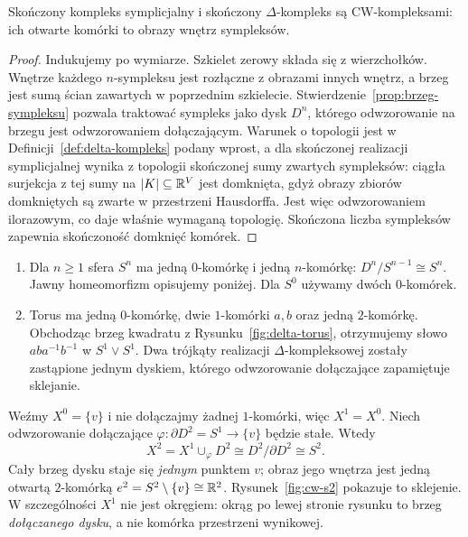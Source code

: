 \begin{stwierdzenie}
\label{prop:sympleksy-cw}
Skończony kompleks symplicjalny i
skończony $\Delta$-kompleks są
CW-kompleksami: ich otwarte komórki
to obrazy wnętrz sympleksów.
\end{stwierdzenie}
\begin{proof}
Indukujemy po wymiarze. Szkielet
zerowy składa się z wierzchołków.
Wnętrze każdego $n$-sympleksu
jest rozłączne z obrazami innych
wnętrz, a brzeg jest sumą ścian
zawartych w poprzednim szkielecie.
Stwierdzenie~\ref{prop:brzeg-sympleksu}
pozwala traktować sympleks
jako dysk $D^n$, którego
odwzorowanie na brzegu jest odwzorowaniem dołączającym.
Warunek o topologii jest w
Definicji~\ref{def:delta-kompleks}
podany wprost, a dla skończonej
realizacji symplicjalnej wynika
z topologii skończonej sumy zwartych sympleksów:
ciągła surjekcja z tej sumy na $|K|\subseteq\mathbb{R}^V$ jest domknięta,
gdyż obrazy zbiorów domkniętych są zwarte w przestrzeni Hausdorffa.
Jest więc odwzorowaniem ilorazowym, co daje właśnie wymaganą topologię.
Skończona liczba sympleksów
zapewnia skończoność domknięć komórek.
\end{proof}

\begin{przyklad}
\label{prz:cw-sfera-torus}
\begin{enumerate}[label=(\arabic*),leftmargin=*]
\item Dla $n\geq1$ sfera $S^n$
      ma jedną $0$-komórkę i jedną
      $n$-komórkę:
      $D^n/S^{n-1}\cong S^n$.
      Jawny homeomorfizm opisujemy
      poniżej.
      Dla $S^0$ używamy dwóch
      $0$-komórek.
\item Torus ma jedną $0$-komórkę,
      dwie $1$-komórki $a,b$ oraz
      jedną $2$-komórkę. Obchodząc
      brzeg kwadratu z
      Rysunku~\ref{fig:delta-torus},
      otrzymujemy słowo
      $aba^{-1}b^{-1}$ w
      $S^1\vee S^1$.
      Dwa trójkąty realizacji
      $\Delta$-kompleksowej zostały
      zastąpione jednym dyskiem,
      którego odwzorowanie dołączające
      zapamiętuje sklejanie.
\end{enumerate}
\end{przyklad}

\begin{przyklad}
\label{prz:cw-s2}
Weźmy $X^0=\{v\}$ i nie dołączajmy
żadnej $1$-komórki, więc $X^1=X^0$.
Niech odwzorowanie dołączające
$\varphi:\partial D^2=S^1\to\{v\}$
będzie stałe. Wtedy
\[
 X^2=X^1\cup_\varphi D^2
 \cong D^2/\partial D^2\cong S^2.
\]
Cały brzeg dysku staje się \emph{jednym}
punktem $v$; obraz jego wnętrza
jest jedną otwartą $2$-komórką
$e^2=S^2\setminus\{v\}\cong\mathbb{R}^2$.
Rysunek~\ref{fig:cw-s2} pokazuje to
sklejenie. W szczególności
$X^1$ nie jest okręgiem:
okrąg po lewej stronie rysunku
to brzeg \emph{dołączanego dysku},
a nie komórka przestrzeni wynikowej.
\end{przyklad}


